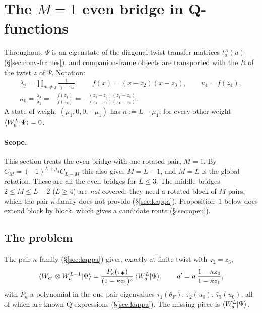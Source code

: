 \section{The $M=1$ even bridge in Q-functions}\label{sec:qform}

{\par}
\noindent Throughout, $\Psi$ is an eigenstate of the diagonal-twist transfer matrices $t^\Lambda_a(u)$
(\S\ref{sec:conv-frames}), and companion-frame objects are transported with the $R$ of the twist $z$ of $\Psi$. Notation:
\begin{gather}
 \lambda_j=\prod_{m\ne j}\frac1{z_j-z_m},\qquad f(x)=(x-z_2)(x-z_3),\qquad u_4=f(z_4),\\
 \kappa_0=\frac{\lambda_4}{\lambda_1}=-\frac{f(z_1)}{f(z_4)}=-\frac{(z_1-z_2)(z_1-z_3)}{(z_4-z_2)(z_4-z_3)} .
\end{gather}
A state of weight $(\mu_1,0,0,-\mu_1)$ has $n:=L-\mu_1$; for every other weight $\langle W_a^L|\Psi\rangle=0$.

\paragraph{Scope.} This section treats the even bridge with one rotated pair, $M=1$. By $C_M=(-1)^{L+\mu_4}C_{L-M}$ this also
gives $M=L-1$, and $M=L$ is the global rotation. These are all the even bridges for $L\le3$. The middle bridges
$2\le M\le L-2$ ($L\ge4$) are \emph{not} covered: they need a rotated block of $M$ pairs, which the pair $\kappa$-family does not
provide (\S\ref{sec:kappa}). Proposition~1 below does extend block by block, which gives a candidate route (\S\ref{sec:open}).

\subsection{The problem}\label{sec:qform-problem}

The pair $\kappa$-family (\S\ref{sec:kappa}) gives, exactly at finite twist with $z_2=z_3$,
\begin{equation}\label{eq:qform-kappa}
 \langle W_{a'}\otimes W_a^{L-1}|\Psi\rangle=\frac{P_\kappa(\tau_\Psi)}{(1-\kappa z_1)^2}\,\langle W_a^L|\Psi\rangle,\qquad
 a'=a\,\frac{1-\kappa z_4}{1-\kappa z_1},
\end{equation}
with $P_\kappa$ a polynomial in the one-pair eigenvalues $\tau_1(\theta_F)$, $\tau_2(u_0)$, $\hat\tau_3(u_0)$, all of which are
known Q-expressions (\S\ref{sec:kappa}). The missing piece is $\langle W_a^L|\Psi\rangle$.

